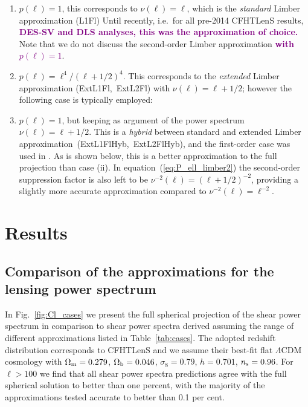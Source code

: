 \documentclass[fleqn,usenatbib]{mnras} %
\newcommand{\LabelTxt}[1]{(\mbox{#1})}
\newcommand{\ch}[1]{\textcolor{purple}{\textbf{#1}}}
\begin{document}
\begin{enumerate}
  \item $p(\ell) = 1$, this corresponds to $\nu(\ell) = \ell$, which is the
    \emph{standard} Limber approximation \LabelTxt{L1Fl}
    Until recently, i.e.~for all pre-2014 CFHTLenS results, \ch{DES-SV \citep{abbott/etal:2016} and DLS \citep{jee/etal:2016} analyses, 
    this was the approximation of choice.}
    Note that we do not discuss the second-order Limber approximation \ch{with $p(\ell)=1$}.
  \item $p(\ell) = \ell^4/(\ell + 1/2)^4$. This corresponds to the \emph{extended} Limber
    approximation \LabelTxt{ExtL1Fl, ExtL2Fl} with $\nu(\ell) = \ell + 1/2$; however the following case is typically employed:
  \item $p(\ell) = 1$, but keeping as argument of the power spectrum $\nu(\ell) = \ell + 1/2$. This is
    a \emph{hybrid} between
    standard and extended Limber approximation~\LabelTxt{ExtL1FlHyb, ExtL2FlHyb}, and the first-order case 
    was used in \cite{KiDS-450,joudaki/etal:2016,joudaki/etal:2017}. As is shown
    below, this is a better approximation to the full projection than case (ii). In equation~(\ref{eq:P_ell_limber2})
    the second-order suppression factor is also left to be $\nu^{-2}(\ell) = (\ell + 1/2)^{-2}$, providing
    a slightly more accurate approximation compared to $\nu^{-2}(\ell) = \ell^{-2}$.
\end{enumerate}
%


\section{Results}
\label{sec:results}

\subsection{Comparison of the approximations for the lensing power spectrum}
\label{sec:comp}


In Fig.~\ref{fig:Cl_cases} we present the full spherical projection of the
shear power spectrum in comparison to shear power spectra derived assuming the
range of different approximations listed in Table~\ref{tab:cases}.  The adopted
redshift distribution corresponds to CFHTLenS \citep{CFHTLenS-2pt-notomo} and
we assume their best-fit flat $\Lambda$CDM cosmology with $\Omega_{\rm
m}=0.279$, $\Omega_{\rm b}=0.046$, $\sigma_8=0.79$, $h=0.701$, $n_{\rm
s}=0.96$. For $\ell > 100$ we find that all shear power spectra predictions
agree with the full spherical solution to better than one percent, with the
majority of the approximations tested accurate to better than 0.1 per cent.   
\end{document}
